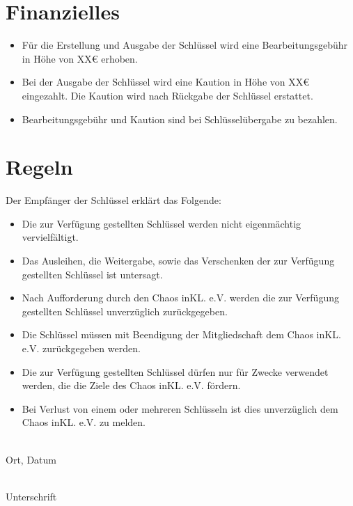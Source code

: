 \documentclass[ngerman,a4paper]{scrartcl}
\begin{document}
\begin{Form}
\section*{Finanzielles}
\begin{itemize}
 \item Für die Erstellung und Ausgabe der Schlüssel wird eine Bearbeitungsgebühr in Höhe von XX€ erhoben.
 \item Bei der Ausgabe der Schlüssel wird eine Kaution in Höhe von XX€ eingezahlt. Die Kaution wird nach Rückgabe der Schlüssel erstattet.
 \item Bearbeitungsgebühr und Kaution sind bei Schlüsselübergabe zu bezahlen.
\end{itemize}

\section*{Regeln}
Der Empfänger der Schlüssel erklärt das Folgende:\\
\begin{itemize}
 \item Die zur Verfügung gestellten Schlüssel werden nicht eigenmächtig vervielfältigt.
 \item Das Ausleihen, die Weitergabe, sowie das Verschenken der zur Verfügung gestellten Schlüssel ist untersagt.
 \item Nach Aufforderung durch den Chaos inKL. e.V. werden die zur Verfügung gestellten Schlüssel unverzüglich zurückgegeben. 
 \item Die Schlüssel müssen mit Beendigung der Mitgliedschaft dem Chaos inKL. e.V. zurückgegeben werden.
 \item Die zur Verfügung gestellten Schlüssel dürfen nur für Zwecke verwendet werden, die die Ziele des Chaos inKL. e.V. fördern.
 \item Bei Verlust von einem oder mehreren Schlüsseln ist dies unverzüglich dem Chaos inKL. e.V. zu melden.
\end{itemize}
\vfill
\begin{minipage}{5cm}
 \dotfill\\
 Ort, Datum
\end{minipage}
\hspace{1cm}
\begin{minipage}{7cm}
 \dotfill\\
 Unterschrift
\end{minipage}
\end{Form}
\end{document}
